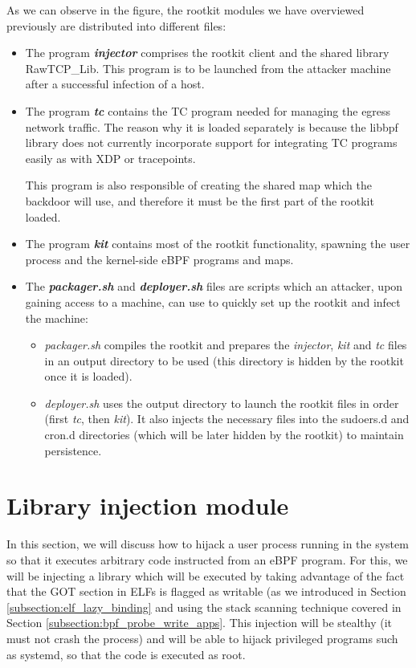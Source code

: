 As we can observe in the figure, the rootkit modules we have overviewed previously are distributed into different files:
\begin{itemize}
\item The program \textit{\textbf{injector}} comprises the rootkit client and the shared library RawTCP\_Lib. This program is to be launched from the attacker machine after a successful infection of a host.
\item The program \textit{\textbf{tc}} contains the TC program needed for managing the egress network traffic. The reason why it is loaded separately is because the libbpf library does not currently incorporate support for integrating TC programs easily as with XDP or tracepoints.

This program is also responsible of creating the shared map which the backdoor will use, and therefore it must be the first part of the rootkit loaded.
\item The program \textit{\textbf{kit}} contains most of the rootkit functionality, spawning the user process and the kernel-side eBPF programs and maps.
\item The \textit{\textbf{packager.sh}} and \textit{\textbf{deployer.sh}} files are scripts which an attacker, upon gaining access to a machine, can use to quickly set up the rootkit and infect the machine:
\begin{itemize}
	\item \textit{packager.sh} compiles the rootkit and prepares the \textit{injector}, \textit{kit} and \textit{tc} files in an output directory to be used (this directory is hidden by the rootkit once it is loaded).
	\item \textit{deployer.sh} uses the output directory to launch the rootkit files in order (first \textit{tc}, then \textit{kit}). It also injects the necessary files into the sudoers.d and cron.d directories (which will be later hidden by the rootkit) to maintain persistence.
\end{itemize}
\end{itemize}



\section{Library injection module} \label{section:lib_injection}
In this section, we will discuss how to hijack a user process running in the system so that it executes arbitrary code instructed from an eBPF program. For this, we will be injecting a library which will be executed by taking advantage of the fact that the GOT section in ELFs is flagged as writable (as we introduced in Section \ref{subsection:elf_lazy_binding} and using the stack scanning technique covered in Section \ref{subsection:bpf_probe_write_apps}. This injection will be stealthy (it must not crash the process) and will be able to hijack privileged programs such as systemd, so that the code is executed as root.

